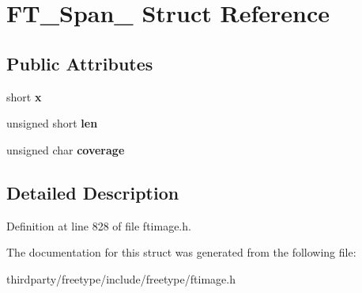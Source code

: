 \hypertarget{struct_f_t___span__}{}\section{F\+T\+\_\+\+Span\+\_\+ Struct Reference}
\label{struct_f_t___span__}
\subsection*{Public Attributes}
\begin{DoxyCompactItemize}
\item 
\mbox{\label{struct_f_t___span___a7f7235a404c66398b49c50fa09691ba5}} 
short {\bfseries x}
\item 
\mbox{\label{struct_f_t___span___a939c84317f25a97d0ba01704591a4d38}} 
unsigned short {\bfseries len}
\item 
\mbox{\label{struct_f_t___span___a70f9c9e0e8d3f0b38adee03a508ae214}} 
unsigned char {\bfseries coverage}
\end{DoxyCompactItemize}


\subsection{Detailed Description}


Definition at line 828 of file ftimage.\+h.



The documentation for this struct was generated from the following file\+:\begin{DoxyCompactItemize}
\item 
thirdparty/freetype/include/freetype/ftimage.\+h\end{DoxyCompactItemize}
